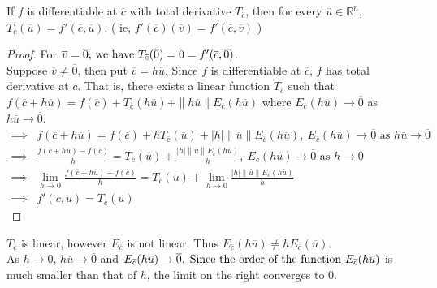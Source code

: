 \begin{theorem}
	If $f$ is differentiable at $\overline{c}$ with total derivative $T_{\overline{c}}$, then for every $\overline{u} \in \mathbb{R}^n$, $T_{\overline{c}}(\overline{u}) = f'(\overline{c},\overline{u})$.
	( ie, \( f'(\overline{c})(\overline{v}) = f'(\overline{c},\overline{v}) \) )
\end{theorem}
\begin{proof}
	For \( \overline{v} = \overline{0}$, we have $T_{\overline{c}}(\overline{0}) = 0 = f'(\overline{c},\overline{0}) \).\\

	Suppose \( \overline{v} \ne \overline{0} \), then put \( \overline{v} = h\overline{u} \).
	Since $f$ is differentiable at $\overline{c}$, $f$ has total derivative at $\overline{c}$.
	That is, there exists a linear function $T_{\overline{c}}$ such that \( f(\overline{c}+h\overline{u}) = f(\overline{c}) + T_{\overline{c}}(h\overline{u}) + \|h\overline{u}\|E_{\overline{c}} (h\overline{u}) \) where $E_{\overline{c}}(h\overline{u}) \to \overline{0}$ as $h\overline{u} \to \overline{0}$.
	\begin{align*}
		\implies  & f(\overline{c}+h\overline{u}) = f(\overline{c}) + hT_{\overline{c}}(\overline{u}) + |h|\|\overline{u}\|E_{\overline{c}} (h\overline{u}),\ E_{\overline{c}}(h\overline{u}) \to \overline{0} \text{ as } h\overline{u} \to \overline{0} \\
		\implies  & \frac{f(\overline{c}+h\overline{u}) - f(\overline{c})}{h} = T_{\overline{c}}(\overline{u}) + \frac{|h|\|\overline{u}\|E_{\overline{c}}(h\overline{u})}{h},\  E_{\overline{c}}(h\overline{u}) \to \overline{0} \text{ as } h \to 0 \\
		\implies  & \lim_{h \to 0} \frac{f(\overline{c}+h\overline{u}) - f(\overline{c})}{h} = T_{\overline{c}}(\overline{u}) + \lim_{h \to 0} \frac{|h|\|\overline{u}\|E_{\overline{c}}(h\overline{u})}{h} \\
		\implies & f'(\overline{c},\overline{u}) = T_{\overline{c}}(\overline{u})
	\end{align*}
\end{proof}

\begin{note}
	$T_{\overline{c}}$ is linear, however $E_{\overline{c}}$ is not linear.
	Thus $E_{\overline{c}}(h\overline{u}) \ne h E_{\overline{c}} (\overline{u})$.\\

	As $h \to 0$, $h\overline{u} \to \overline{0}$ and \( E_{\overline{c}}(h\overline{u}) \to \overline{0}$.
	Since the order of the function \( E_{\overline{c}}(h\overline{u}) \) is much smaller than that of $h$, the limit on the right converges to 0.
\end{note}

